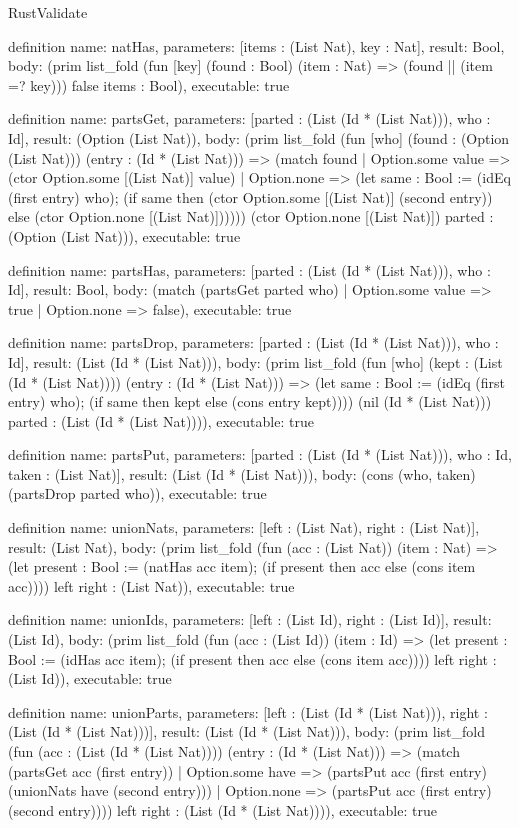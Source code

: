 \begin{lexlean}{RustValidate}
\begin{semanticmodule}
definition{
  name: natHas,
  parameters: [items : (List Nat), key : Nat],
  result: Bool,
  body: (prim list_fold (fun [key] (found : Bool) (item : Nat) => (found || (item =? key))) false items : Bool),
  executable: true
}

definition{
  name: partsGet,
  parameters: [parted : (List (Id * (List Nat))), who : Id],
  result: (Option (List Nat)),
  body: (prim list_fold (fun [who] (found : (Option (List Nat))) (entry : (Id * (List Nat))) => (match found
    | Option.some value => (ctor Option.some [(List Nat)] value)
    | Option.none => (let same : Bool := (idEq (first entry) who); (if same then (ctor Option.some [(List Nat)] (second entry)) else (ctor Option.none [(List Nat)]))))) (ctor Option.none [(List Nat)]) parted : (Option (List Nat))),
  executable: true
}

definition{
  name: partsHas,
  parameters: [parted : (List (Id * (List Nat))), who : Id],
  result: Bool,
  body: (match (partsGet parted who) | Option.some value => true | Option.none => false),
  executable: true
}

definition{
  name: partsDrop,
  parameters: [parted : (List (Id * (List Nat))), who : Id],
  result: (List (Id * (List Nat))),
  body: (prim list_fold (fun [who] (kept : (List (Id * (List Nat)))) (entry : (Id * (List Nat))) => (let same : Bool := (idEq (first entry) who); (if same then kept else (cons entry kept)))) (nil (Id * (List Nat))) parted : (List (Id * (List Nat)))),
  executable: true
}

definition{
  name: partsPut,
  parameters: [parted : (List (Id * (List Nat))), who : Id, taken : (List Nat)],
  result: (List (Id * (List Nat))),
  body: (cons (who, taken) (partsDrop parted who)),
  executable: true
}

definition{
  name: unionNats,
  parameters: [left : (List Nat), right : (List Nat)],
  result: (List Nat),
  body: (prim list_fold (fun (acc : (List Nat)) (item : Nat) => (let present : Bool := (natHas acc item); (if present then acc else (cons item acc)))) left right : (List Nat)),
  executable: true
}

definition{
  name: unionIds,
  parameters: [left : (List Id), right : (List Id)],
  result: (List Id),
  body: (prim list_fold (fun (acc : (List Id)) (item : Id) => (let present : Bool := (idHas acc item); (if present then acc else (cons item acc)))) left right : (List Id)),
  executable: true
}

definition{
  name: unionParts,
  parameters: [left : (List (Id * (List Nat))), right : (List (Id * (List Nat)))],
  result: (List (Id * (List Nat))),
  body: (prim list_fold (fun (acc : (List (Id * (List Nat)))) (entry : (Id * (List Nat))) => (match (partsGet acc (first entry))
    | Option.some have => (partsPut acc (first entry) (unionNats have (second entry)))
    | Option.none => (partsPut acc (first entry) (second entry)))) left right : (List (Id * (List Nat)))),
  executable: true
}


\end{semanticmodule}
\end{lexlean}
